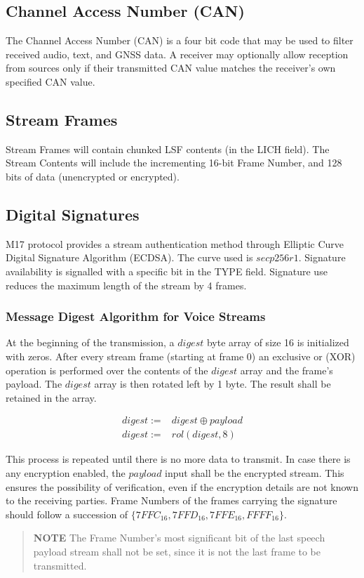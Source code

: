 \documentclass[a4paper,11pt,oneside]{book}
\begin{document}
\subsection{Channel Access Number (CAN)}

The Channel Access Number (CAN) is a four bit code that may be used to filter received audio, text, and GNSS data. A receiver may optionally allow reception from sources only if their transmitted CAN value matches the receiver's own specified CAN value.

\subsection{Stream Frames}

Stream Frames will contain chunked LSF contents (in the LICH field). The Stream Contents will include the incrementing 16-bit Frame Number, and 128 bits of data (unencrypted or encrypted).

\subsection{Digital Signatures}
M17 protocol provides a stream authentication method through Elliptic Curve Digital Signature Algorithm (ECDSA). The curve used is $secp256r1$. Signature availability is signalled with a specific bit in the TYPE field. Signature use reduces the maximum length of the stream by 4 frames.

\subsubsection{Message Digest Algorithm for Voice Streams}
At the beginning of the transmission, a $digest$ byte array of size 16 is initialized with zeros. After every stream frame (starting at frame 0) an exclusive or (XOR) operation is performed over the contents of the $digest$ array and the frame's payload. The $digest$ array is then rotated left by 1 byte. The result shall be retained in the array.

\begin{align*}
	digest :=& digest \oplus payload \\
	digest :=& rol(digest, 8)
\end{align*}

This process is repeated until there is no more data to transmit. In case there is any encryption enabled, the $payload$ input shall be the encrypted stream. This ensures the possibility of verification, even if the encryption details are not known to the receiving parties. Frame Numbers of the frames carrying the signature should follow a succession of $\{7FFC_{16}, 7FFD_{16}, 7FFE_{16}, FFFF_{16}\}$.
\begin{quote}
	\textbf{NOTE} The Frame Number's most significant bit of the last speech payload stream shall not be set, since it is not the last frame to be transmitted.
\end{quote}
\end{document}
